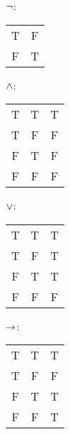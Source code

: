 \begin{center}
			\begin{minipage}{.25\textwidth}$\neg$:\,
				\begin{tabular}{c@{ $\leadsto$ }c}
				T&F\\
				F&T
				\end{tabular}
			\end{minipage}
			\begin{minipage}{.35\textwidth}$\mathbin{\wedge}$:\,
				\begin{tabular}{c@{, }c@{ $\leadsto$ }c}
				T&T&T\\
				T&F&F\\
				F&T&F\\
				F&F&F
				\end{tabular}
			\end{minipage}
			\begin{minipage}{.35\textwidth}$\vee$:\,
				\begin{tabular}{c@{, }c@{ $\leadsto$ }c}
				T&T&T\\
				T&F&T\\
				F&T&T\\
				F&F&F
				\end{tabular}
			\end{minipage}
			
			\medskip 
			\begin{minipage}{.35\textwidth}$\rightarrow$:\,
				\begin{tabular}{c@{, }c@{ $\leadsto$ }c}
				T&T&T\\
				T&F&F\\
				F&T&T\\
				F&F&T
				\end{tabular}
			\end{minipage}
	\end{center}


